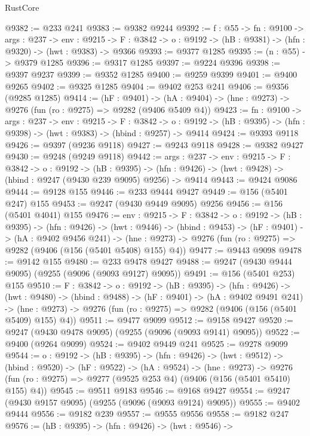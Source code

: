 \begin{lexlean}{RustCore}
\begin{coremodule}
@9382 := @233 @241
@9383 := @9382 @9244
@9392 := {f : @55} ->
  {fn : @9100} ->
  {args : @237} ->
  {env : @9215} ->
  {F : @3842} -> {o : @9192} -> (hB : @9381) -> (hfn : @9320) -> (hwt : @9383) -> @9366
@9393 := @9377 @1285
@9395 := (n : @55) -> @9379 @1285
@9396 := @9317 @1285
@9397 := @9224 @9396
@9398 := @9397 @9237
@9399 := @9352 @1285
@9400 := @9259 @9399
@9401 := @9400 @9265
@9402 := @9325 @1285
@9404 := @9402 @253 @241
@9406 := @9356 (@9285 @1285)
@9414 := (hF : @9401) ->
  (hA : @9404) -> (hne : @9273) -> @9276 (fun (ro : @9275) => @9282 (@9406 @5409 @4))
@9423 := {fn : @9100} ->
  {args : @237} ->
  {env : @9215} ->
  {F : @3842} ->
  {o : @9192} -> (hB : @9395) -> (hfn : @9398) -> (hwt : @9383) -> (hbind : @9257) -> @9414
@9424 := @9393 @9118
@9426 := @9397 (@9236 @9118)
@9427 := @9243 @9118
@9428 := @9382 @9427
@9430 := @9248 (@9249 @9118)
@9442 := {args : @237} ->
  {env : @9215} ->
  {F : @3842} ->
  {o : @9192} ->
  (hB : @9395) ->
  (hfn : @9426) -> (hwt : @9428) -> (hbind : @9247 (@9430 @239 @9095) @9256) -> @9414
@9443 := @9424 @9086
@9444 := @9128 @155
@9446 := @233 @9444 @9427
@9449 := @156 (@5401 @247) @155
@9453 := @9247 (@9430 @9449 @9095) @9256
@9456 := @156 (@5401 @4041) @155
@9476 := {env : @9215} ->
  {F : @3842} ->
  {o : @9192} ->
  (hB : @9395) ->
  (hfn : @9426) ->
  (hwt : @9446) ->
  (hbind : @9453) ->
  (hF : @9401) ->
  (hA : @9402 @9456 @241) ->
  (hne : @9273) -> @9276 (fun (ro : @9275) => @9282 (@9406 (@156 (@5401 @5408) @155) @4))
@9477 := @9443 @9098
@9478 := @9142 @155
@9480 := @233 @9478 @9427
@9488 := @9247 (@9430 @9444 @9095) (@9255 (@9096 (@9093 @9127) @9095))
@9491 := @156 (@5401 @253) @155
@9510 := {F : @3842} ->
  {o : @9192} ->
  (hB : @9395) ->
  (hfn : @9426) ->
  (hwt : @9480) ->
  (hbind : @9488) ->
  (hF : @9401) ->
  (hA : @9402 @9491 @241) ->
  (hne : @9273) -> @9276 (fun (ro : @9275) => @9282 (@9406 (@156 (@5401 @5409) @155) @4))
@9511 := @9477 @9099
@9512 := @9158 @9427
@9520 := @9247 (@9430 @9478 @9095) (@9255 (@9096 (@9093 @9141) @9095))
@9522 := @9400 (@9264 @9099)
@9524 := @9402 @9449 @241
@9525 := @9278 @9099
@9544 := {o : @9192} ->
  (hB : @9395) ->
  (hfn : @9426) ->
  (hwt : @9512) ->
  (hbind : @9520) ->
  (hF : @9522) ->
  (hA : @9524) ->
  (hne : @9273) ->
  @9276 (fun (ro : @9275) => @9277 (@9525 @253 @4) (@9406 (@156 (@5401 @5410) @155) @4))
@9545 := @9511 @9183
@9546 := @9168 @9427
@9554 := @9247 (@9430 @9157 @9095) (@9255 (@9096 (@9093 @9124) @9095))
@9555 := @9402 @9444
@9556 := @9182 @239
@9557 := @9555 @9556
@9558 := @9182 @247
@9576 := (hB : @9395) ->
  (hfn : @9426) ->
  (hwt : @9546) ->

\end{coremodule}
\end{lexlean}
